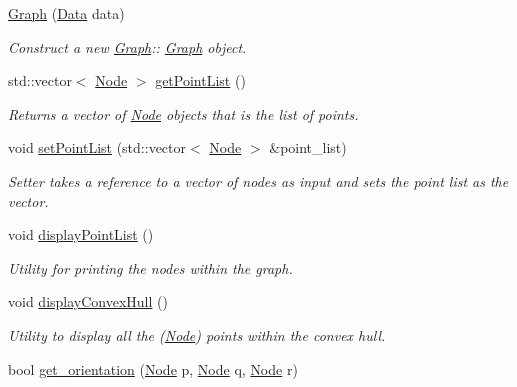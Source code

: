 \begin{DoxyCompactItemize}
\item 
\hyperlink{classGraph_ad2e96f43e60cd916a3bccab231fc7570}{Graph} (\hyperlink{classData}{Data} data)
\begin{DoxyCompactList}\small\item\em Construct a new \hyperlink{classGraph}{Graph}\+:\+: \hyperlink{classGraph}{Graph} object. \end{DoxyCompactList}\item 
std\+::vector$<$ \hyperlink{classNode}{Node} $>$ \hyperlink{classGraph_a8231d26a14b98e1b745dc589206288f0}{get\+Point\+List} ()
\begin{DoxyCompactList}\small\item\em Returns a vector of \hyperlink{classNode}{Node} objects that is the list of points. \end{DoxyCompactList}\item 
void \hyperlink{classGraph_ac3d8fd4be7db3fd814b68499322b9cba}{set\+Point\+List} (std\+::vector$<$ \hyperlink{classNode}{Node} $>$ \&point\+\_\+list)
\begin{DoxyCompactList}\small\item\em Setter takes a reference to a vector of nodes as input and sets the point list as the vector. \end{DoxyCompactList}\item 
\mbox{\label{classGraph_af17d100a4c98374793b04f7eb57532d4}} 
void \hyperlink{classGraph_af17d100a4c98374793b04f7eb57532d4}{display\+Point\+List} ()
\begin{DoxyCompactList}\small\item\em Utility for printing the nodes within the graph. \end{DoxyCompactList}\item 
\mbox{\label{classGraph_a76a6670d6c92e56bfc20a3d581a633ff}} 
void \hyperlink{classGraph_a76a6670d6c92e56bfc20a3d581a633ff}{display\+Convex\+Hull} ()
\begin{DoxyCompactList}\small\item\em Utility to display all the (\hyperlink{classNode}{Node}) points within the convex hull. \end{DoxyCompactList}\item 
bool \hyperlink{classGraph_a657f8174fb95bd7bfd99556cfb4cbd65}{get\+\_\+orientation} (\hyperlink{classNode}{Node} p, \hyperlink{classNode}{Node} q, \hyperlink{classNode}{Node} r)

\end{DoxyCompactItemize}
